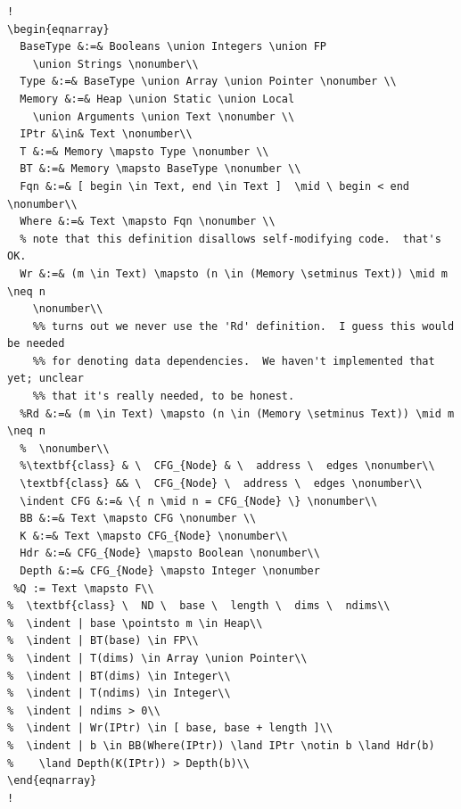 \begin{lstlisting}[label=lst:model,escapechar=!,caption=Definitions for an
abstract machine and analysis based on control flow properties.]
!
\begin{eqnarray}
  BaseType &:=& Booleans \union Integers \union FP
    \union Strings \nonumber\\
  Type &:=& BaseType \union Array \union Pointer \nonumber \\
  Memory &:=& Heap \union Static \union Local
    \union Arguments \union Text \nonumber \\
  IPtr &\in& Text \nonumber\\
  T &:=& Memory \mapsto Type \nonumber \\
  BT &:=& Memory \mapsto BaseType \nonumber \\
  Fqn &:=& [ begin \in Text, end \in Text ]  \mid \ begin < end \nonumber\\
  Where &:=& Text \mapsto Fqn \nonumber \\
  % note that this definition disallows self-modifying code.  that's OK.
  Wr &:=& (m \in Text) \mapsto (n \in (Memory \setminus Text)) \mid m \neq n
    \nonumber\\
	%% turns out we never use the 'Rd' definition.  I guess this would be needed
	%% for denoting data dependencies.  We haven't implemented that yet; unclear
	%% that it's really needed, to be honest.
  %Rd &:=& (m \in Text) \mapsto (n \in (Memory \setminus Text)) \mid m \neq n
  %  \nonumber\\
  %\textbf{class} & \  CFG_{Node} & \  address \  edges \nonumber\\
  \textbf{class} && \  CFG_{Node} \  address \  edges \nonumber\\
  \indent CFG &:=& \{ n \mid n = CFG_{Node} \} \nonumber\\
  BB &:=& Text \mapsto CFG \nonumber \\
  K &:=& Text \mapsto CFG_{Node} \nonumber\\
  Hdr &:=& CFG_{Node} \mapsto Boolean \nonumber\\
  Depth &:=& CFG_{Node} \mapsto Integer \nonumber
 %Q := Text \mapsto F\\
%  \textbf{class} \  ND \  base \  length \  dims \  ndims\\
%  \indent | base \pointsto m \in Heap\\
%  \indent | BT(base) \in FP\\
%  \indent | T(dims) \in Array \union Pointer\\
%  \indent | BT(dims) \in Integer\\
%  \indent | T(ndims) \in Integer\\
%  \indent | ndims > 0\\
%  \indent | Wr(IPtr) \in [ base, base + length ]\\
%  \indent | b \in BB(Where(IPtr)) \land IPtr \notin b \land Hdr(b)
%    \land Depth(K(IPtr)) > Depth(b)\\
\end{eqnarray}
!
\end{lstlisting}


